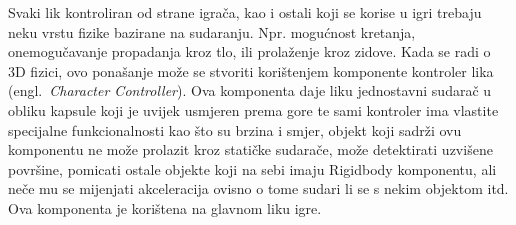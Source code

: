Svaki lik kontroliran od strane igrača, kao i ostali koji se korise u igri trebaju neku vrstu fizike bazirane na sudaranju. Npr. mogućnost kretanja, onemogučavanje propadanja kroz tlo, ili prolaženje kroz zidove. Kada se radi o 3D fizici, ovo ponašanje može se stvoriti korištenjem komponente kontroler lika (engl.~\textit{Character Controller}). Ova komponenta daje liku jednostavni sudarač u obliku kapsule koji je uvijek usmjeren prema gore te sami kontroler ima vlastite specijalne funkcionalnosti kao što su brzina i smjer, objekt koji sadrži ovu komponentu ne može prolazit kroz statičke sudarače, može detektirati uzvišene površine, pomicati ostale objekte koji na sebi imaju Rigidbody komponentu, ali neče mu se mijenjati akceleracija ovisno o tome sudari li se s nekim objektom itd. Ova komponenta je korištena na glavnom liku igre.

